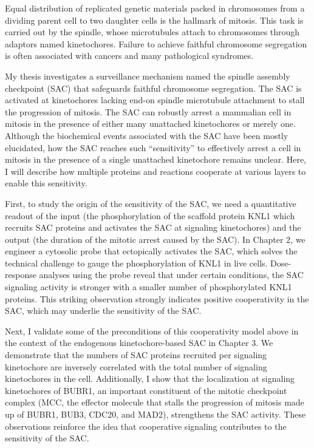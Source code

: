 Equal distribution of replicated genetic materials packed in chromosomes from a dividing parent cell to two daughter cells is the hallmark of mitosis. This task is carried out by the spindle, whose microtubules attach to chromosomes through adaptors named kinetochores. Failure to achieve faithful chromosome segregation is often associated with cancers and many pathological syndromes.

My thesis investigates a surveillance mechanism named the spindle assembly checkpoint (SAC) that safeguards faithful chromosome segregation. The SAC is activated at kinetochores lacking end-on spindle microtubule attachment to stall the progression of mitosis. The SAC can robustly arrest a mammalian cell in mitosis in the presence of either many unattached kinetochores or merely one. Although the biochemical events associated with the SAC have been mostly elucidated, how the SAC reaches such ``sensitivity'' to effectively arrest a cell in mitosis in the presence of a single unattached kinetochore remains unclear. Here, I will describe how multiple proteins and reactions cooperate at various layers to enable this sensitivity.

First, to study the origin of the sensitivity of the SAC, we need a quantitative readout of the input (the phosphorylation of the scaffold protein KNL1 which recruits SAC proteins and activates the SAC at signaling kinetochores) and the output (the duration of the mitotic arrest caused by the SAC). In Chapter 2, we engineer a cytosolic probe that ectopically activates the SAC, which solves the technical challenge to gauge the phosphorylation of KNL1 in live cells. Dose-response analyses using the probe reveal that under certain conditions, the SAC signaling activity is stronger with a smaller number of phosphorylated KNL1 proteins. This striking observation strongly indicates positive cooperativity in the SAC, which may underlie the sensitivity of the SAC.

Next, I validate some of the preconditions of this cooperativity model above in the context of the endogenous kinetochore-based SAC in Chapter 3. We demonstrate %
that the numbers of SAC proteins recruited per signaling kinetochore are inversely correlated with the total number of signaling kinetochores in the cell. Additionally, I show that the localization at signaling kinetochores of BUBR1, an important constituent of the mitotic checkpoint complex (MCC, the effector molecule that stalls the progression of mitosis made up of BUBR1, BUB3, CDC20, and MAD2), strengthens the SAC activity. These observations reinforce the idea that cooperative signaling contributes to the sensitivity of the SAC.

